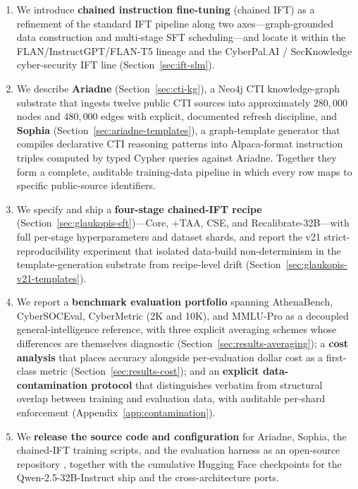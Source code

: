 \documentclass[webpdf,contemporary,large]{oup-authoring-template}
\theoremstyle{thmstyleone}
\theoremstyle{thmstyletwo}
\theoremstyle{thmstylethree}
\begin{document}
\begin{enumerate}
  \item We introduce \textbf{chained instruction fine-tuning} (chained IFT) as a refinement of the standard IFT pipeline along two axes---graph-grounded data construction and multi-stage SFT scheduling---and locate it within the FLAN/InstructGPT/FLAN-T5 lineage and the CyberPal.AI / SecKnowledge cyber-security IFT line (Section~\ref{sec:ift-slm}).

  \item We describe \textbf{Ariadne} (Section~\ref{sec:cti-kg}), a Neo4j CTI knowledge-graph substrate that ingests twelve public CTI sources into approximately $280{,}000$ nodes and $480{,}000$ edges with explicit, documented refresh discipline, and \textbf{Sophia} (Section~\ref{sec:ariadne-templates}), a graph-template generator that compiles declarative CTI reasoning patterns into Alpaca-format instruction triples computed by typed Cypher queries against Ariadne. Together they form a complete, auditable training-data pipeline in which every row maps to specific public-source identifiers.

  \item We specify and ship a \textbf{four-stage chained-IFT recipe} (Section~\ref{sec:glaukopis-sft})---Core, +TAA, CSE, and Recalibrate-32B---with full per-stage hyperparameters and dataset shards, and report the v21 strict-reproducibility experiment that isolated data-build non-determinism in the template-generation substrate from recipe-level drift (Section~\ref{sec:glaukopis-v21-templates}).

  \item We report a \textbf{benchmark evaluation portfolio} spanning AthenaBench, CyberSOCEval, CyberMetric (2K and 10K), and MMLU-Pro as a decoupled general-intelligence reference, with three explicit averaging schemes whose differences are themselves diagnostic (Section~\ref{sec:results-averaging}); a \textbf{cost analysis} that places accuracy alongside per-evaluation dollar cost as a first-class metric (Section~\ref{sec:results-cost}); and an \textbf{explicit data-contamination protocol} that distinguishes verbatim from structural overlap between training and evaluation data, with auditable per-shard enforcement (Appendix~\ref{app:contamination}).

  \item We \textbf{release the source code and configuration} for Ariadne, Sophia, the chained-IFT training scripts, and the evaluation harness as an open-source repository \cite{glaukopis2026repo}, together with the cumulative Hugging Face checkpoints for the Qwen-2.5-32B-Instruct ship and the cross-architecture ports.
\end{enumerate}
\end{document}
